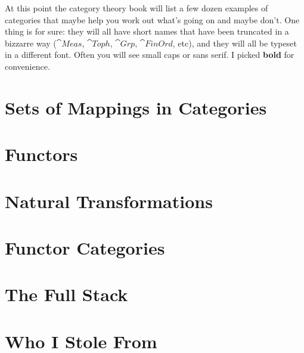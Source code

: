 \documentclass[12pt]{article}
\theoremstyle{definition}
\theoremstyle{remark}
\numberwithin{equation}{section}
\begin{document}
At this point the category theory book will list a few dozen examples of categories that maybe help you work out what's going on and maybe don't. One thing is for sure: they will all have short names that have been truncated in a bizzarre way ($\cat{Meas}$, $\cat{Toph}$, $\cat{Grp}$, $\cat{FinOrd}$, etc), and they will all be typeset in a different font. Often you will see {\sc small caps} or {\sf sans serif}. I picked {\bf bold} for convenience.


\section{Sets of Mappings in Categories}

\section{Functors}

\section{Natural Transformations}

\section{Functor Categories}

\section{The Full Stack}

\section{Who I Stole From}
\end{document}
